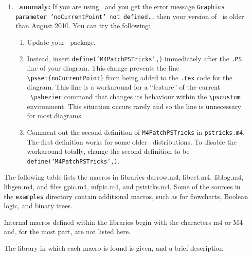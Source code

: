 \begin{enumerate}
\item {\bf \PSTricks\ anomaly:} If you are using \PSTricks\ and
  you get the error message {\tt Graphics parameter `noCurrentPoint'
  not defined..} then your version of \PSTricks\ is older than
  August 2010.  You can try the following:
  \begin{enumerate}
  \item Update your \PSTricks\ package.
  \item Instead, insert {\tt define(`M4PatchPSTricks',)} immediately after the
   {\tt .PS} line of your diagram.
  This change prevents the line
  \verb|\psset{noCurrentPoint}| from being added to the {\tt .tex}
  code for the diagram.  This line is a workaround for a ``feature''
  of the current \PSTricks\ \verb|\psbezier| command that changes its
  behaviour within the \verb|\pscustom| environment.  This situation
  occurs rarely and so the line is unnecessary for most diagrams.
  \item Comment out the second definition of {\tt M4PatchPSTricks} in
  {\tt pstricks.m4}.  The first definition works for some older
  \PSTricks\ distributions.
  To disable the workaround totally, change the second definition
  to be {\tt define(`M4PatchPSTricks',)}.
  \end{enumerate}


\end{enumerate}

\label{defines}
The following table lists the macros in libraries
darrow.m4, libcct.m4, liblog.m4, libgen.m4, and files gpic.m4, mfpic.m4,
and pstricks.m4.  Some of the sources in the {\tt examples}
directory contain additional macros, such as for flowcharts,
Boolean logic, and binary trees.

Internal macros defined within the libraries begin with the characters
m4 or M4 and, for the most part, are not listed here.

The library in which each macro is found is given, and a brief description.

\endinput
